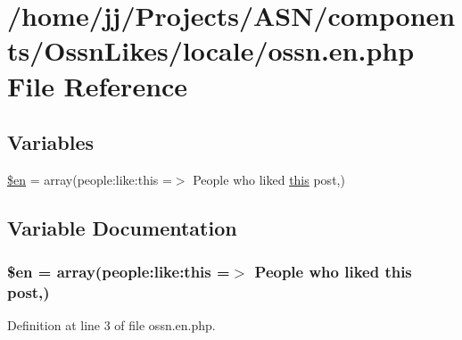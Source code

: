\hypertarget{components_2_ossn_likes_2locale_2ossn_8en_8php}{}\section{/home/jj/\+Projects/\+A\+S\+N/components/\+Ossn\+Likes/locale/ossn.en.\+php File Reference}
\label{components_2_ossn_likes_2locale_2ossn_8en_8php}
\subsection*{Variables}
\begin{DoxyCompactItemize}
\item 
\hyperlink{components_2_ossn_likes_2locale_2ossn_8en_8php_a48abc714dfb71c8fffa83cf49f452115}{\$en} = array(\textquotesingle{}people\+:like\+:this\textquotesingle{} =$>$ \textquotesingle{}People who liked \hyperlink{table_2plugin_8min_8js_a05c09a5e9d53fa7adf0a7936038c2fa3}{this} post\textquotesingle{},)
\end{DoxyCompactItemize}


\subsection{Variable Documentation}
\subsubsection[{\texorpdfstring{\$en}{$en}}]{\setlength{\rightskip}{0pt plus 5cm}\$en = array(\textquotesingle{}people\+:like\+:this\textquotesingle{} =$>$ \textquotesingle{}People who liked {\bf this} post\textquotesingle{},)}\hypertarget{components_2_ossn_likes_2locale_2ossn_8en_8php_a48abc714dfb71c8fffa83cf49f452115}{}\label{components_2_ossn_likes_2locale_2ossn_8en_8php_a48abc714dfb71c8fffa83cf49f452115}


Definition at line 3 of file ossn.\+en.\+php.

